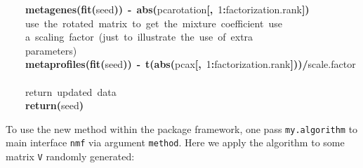 \documentclass[a4paper]{article}\usepackage{graphicx, color}
\makeatletter
\newcommand{\hlnumber}[1]{\textcolor[rgb]{0,0,0}{#1}}%
\newcommand{\hlfunctioncall}[1]{\textcolor[rgb]{0.501960784313725,0,0.329411764705882}{\textbf{#1}}}%
\newcommand{\hlkeyword}[1]{\textcolor[rgb]{0,0,0}{\textbf{#1}}}%
\newcommand{\hlcomment}[1]{\textcolor[rgb]{0.180392156862745,0.6,0.341176470588235}{#1}}%
\newcommand{\hlassignement}[1]{\textcolor[rgb]{0,0,0}{\textbf{#1}}}%
\newcommand{\hlsymbol}[1]{\textcolor[rgb]{0,0,0}{#1}}%
\newcommand{\hlstd}[1]{\textcolor[rgb]{0,0,0}{#1}}%
\newenvironment{kframe}{%
 \def\FrameCommand##1{\hskip\@totalleftmargin \hskip-\fboxsep
 \colorbox{shadecolor}{##1}\hskip-\fboxsep
     \hskip-\linewidth \hskip-\@totalleftmargin \hskip\columnwidth}%
 \MakeFramed {\advance\hsize-\width
   \@totalleftmargin\z@ \linewidth\hsize
   \@setminipage}}%
 {\par\unskip\endMakeFramed}
\newenvironment{knitrout}{}{} %
\let\code=\texttt
\makeatother
\begin{document}
\begin{knitrout}
\begin{kframe}
\begin{flushleft}
\hlstd{}{\ }{\ }{\ }{\ }\hlfunctioncall{metagenes}\hlkeyword{(}\hlfunctioncall{fit}\hlkeyword{(}\hlsymbol{seed}\hlkeyword{)}\hlkeyword{)}{\ }\hlassignement{\usebox{\hlnormalsizeboxlessthan}-}{\ }\hlfunctioncall{abs}\hlkeyword{(}\hlsymbol{pca}\hlkeyword{\usebox{\hlnormalsizeboxdollar}}\hlsymbol{rotation}\hlkeyword{[}\hlkeyword{,}{\ }\hlnumber{1}\hlkeyword{:}\hlsymbol{factorization.rank}\hlkeyword{]}\hlkeyword{)}\hspace*{\fill}\\
\hlstd{}{\ }{\ }{\ }{\ }\hlcomment{\usebox{\hlnormalsizeboxhash}{\ }use{\ }the{\ }rotated{\ }matrix{\ }to{\ }get{\ }the{\ }mixture{\ }coefficient{\ }use}\hspace*{\fill}\\
\hlstd{}{\ }{\ }{\ }{\ }\hlcomment{\usebox{\hlnormalsizeboxhash}{\ }a{\ }scaling{\ }factor{\ }(just{\ }to{\ }illustrate{\ }the{\ }use{\ }of{\ }extra}\hspace*{\fill}\\
\hlstd{}{\ }{\ }{\ }{\ }\hlcomment{\usebox{\hlnormalsizeboxhash}{\ }parameters)}\hspace*{\fill}\\
\hlstd{}{\ }{\ }{\ }{\ }\hlfunctioncall{metaprofiles}\hlkeyword{(}\hlfunctioncall{fit}\hlkeyword{(}\hlsymbol{seed}\hlkeyword{)}\hlkeyword{)}{\ }\hlassignement{\usebox{\hlnormalsizeboxlessthan}-}{\ }\hlfunctioncall{t}\hlkeyword{(}\hlfunctioncall{abs}\hlkeyword{(}\hlsymbol{pca}\hlkeyword{\usebox{\hlnormalsizeboxdollar}}\hlsymbol{x}\hlkeyword{[}\hlkeyword{,}{\ }\hlnumber{1}\hlkeyword{:}\hlsymbol{factorization.rank}\hlkeyword{]}\hlkeyword{)}\hlkeyword{)}\hlkeyword{/}\hlsymbol{scale.factor}\hspace*{\fill}\\
\hlstd{}\hspace*{\fill}\\
\hlstd{}{\ }{\ }{\ }{\ }\hlcomment{\usebox{\hlnormalsizeboxhash}{\ }return{\ }updated{\ }data}\hspace*{\fill}\\
\hlstd{}{\ }{\ }{\ }{\ }\hlfunctioncall{return}\hlkeyword{(}\hlsymbol{seed}\hlkeyword{)}\hspace*{\fill}\\
\hlstd{}\hlkeyword{\usebox{\hlnormalsizeboxclosebrace}}\mbox{}
\normalfont
\end{flushleft}
\end{kframe}
\end{knitrout}


To use the new method within the package framework, one pass \code{my.algorithm} to main interface \code{nmf} via argument \code{method}. 
Here we apply the algorithm to some matrix \code{V} randomly generated: 
\end{document}
